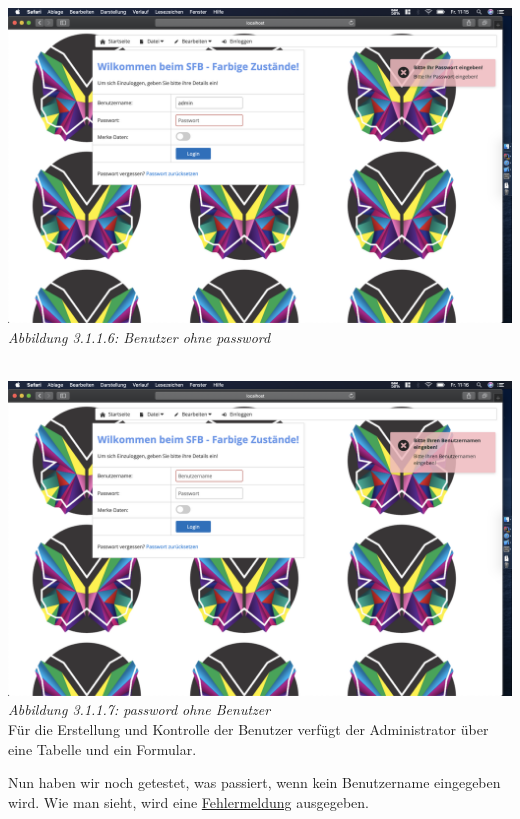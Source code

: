 \documentclass[enabledeprecatedfontcommands,fontsize=12pt,paper=a4,twoside]{scrartcl}
\begin{document}
\hypertarget{sc3.1.1.6}{
\includegraphics[width=1\textwidth]{Screenshots/311BittePasswordEingeben.png}\\ \textit{Abbildung 3.1.1.6: Benutzer ohne password}
} \\

\hypertarget{sc3.1.1.7}{
\includegraphics[width=1\textwidth]{Screenshots/311PasswordohneBenutzer.png}
\textit{Abbildung 3.1.1.7: password ohne Benutzer}
} \\


Für die Erstellung und Kontrolle der Benutzer verfügt der Administrator über eine Tabelle und ein Formular.

Nun haben wir noch getestet, was passiert, wenn kein Benutzername eingegeben wird. Wie man sieht, wird eine  \hyperlink{sc3.1.1.8}{Fehlermeldung} ausgegeben. \\
\end{document}
